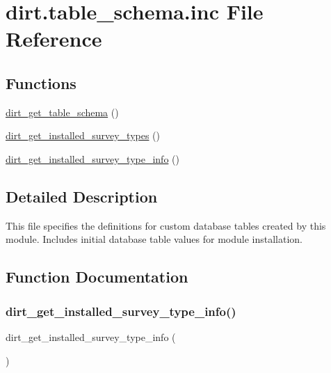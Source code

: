 \hypertarget{dirt_8table__schema_8inc}{}\section{dirt.\+table\+\_\+schema.\+inc File Reference}
\label{dirt_8table__schema_8inc}
\subsection*{Functions}
\begin{DoxyCompactItemize}
\item 
\mbox{\hyperlink{dirt_8table__schema_8inc_aca1fa6c60ceaf1a0d104bed6355379f3}{dirt\+\_\+get\+\_\+table\+\_\+schema}} ()
\item 
\mbox{\hyperlink{dirt_8table__schema_8inc_a9b7118c6199293f2aaf242a8af05d49e}{dirt\+\_\+get\+\_\+installed\+\_\+survey\+\_\+types}} ()
\item 
\mbox{\hyperlink{dirt_8table__schema_8inc_a57c3e0268306a5544b8a92f07799c161}{dirt\+\_\+get\+\_\+installed\+\_\+survey\+\_\+type\+\_\+info}} ()
\end{DoxyCompactItemize}


\subsection{Detailed Description}
This file specifies the definitions for custom database tables created by this module. Includes initial database table values for module installation. 

\subsection{Function Documentation}
\mbox{\label{dirt_8table__schema_8inc_a57c3e0268306a5544b8a92f07799c161}} 
\subsubsection{\texorpdfstring{dirt\+\_\+get\+\_\+installed\+\_\+survey\+\_\+type\+\_\+info()}{dirt\_get\_installed\_survey\_type\_info()}}
{\footnotesize\ttfamily dirt\+\_\+get\+\_\+installed\+\_\+survey\+\_\+type\+\_\+info (\begin{DoxyParamCaption}{ }\end{DoxyParamCaption})}

